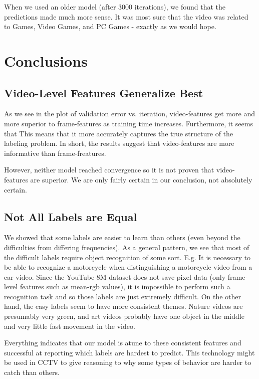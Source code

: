 \documentclass{article}
\newcommand{\ind}[0]{\indent}
\begin{document}
When we used an older model (after 3000 iterations), we found that the predictions made much more sense. It was most sure that the video was related to Games, Video Games, and PC Games - exactly as we would hope.

\section{Conclusions}

\subsection{Video-Level Features Generalize Best}
\ind\ind As we see in the plot of validation error vs. iteration, video-features get more and more superior to frame-features as training time increases. Furthermore, it seems that This means that it more accurately captures the true structure of the labeling problem. In short, the results suggest that video-features are more informative than frame-freatures.

However, neither model reached convergence so it is not proven that video-features are superior. We are only fairly certain in our conclusion, not absolutely certain.

\subsection{Not All Labels are Equal}
\ind\ind We showed that some labels are easier to learn than others (even beyond the difficulties from differing frequencies). As a general pattern, we see that most of the difficult labels require object recognition of some sort. E.g. It is necessary to be able to recognize a motorcycle when distinguishing a motorcycle video from a car video. Since the YouTube-8M dataset does not save pixel data (only frame-level features such as mean-rgb values), it is impossible to perform such a recognition task and so those labels are just extremely difficult. On the other hand, the easy labels seem to have more consistent themes. Nature videos are presumably very green, and art videos probably have one object in the middle and very little fast movement in the video. 

Everything indicates that our model is atune to these consistent features and successful at reporting which labels are hardest to predict. This technology might be used in CCTV to give reasoning to why some types of behavior are harder to catch than others.
\end{document}
